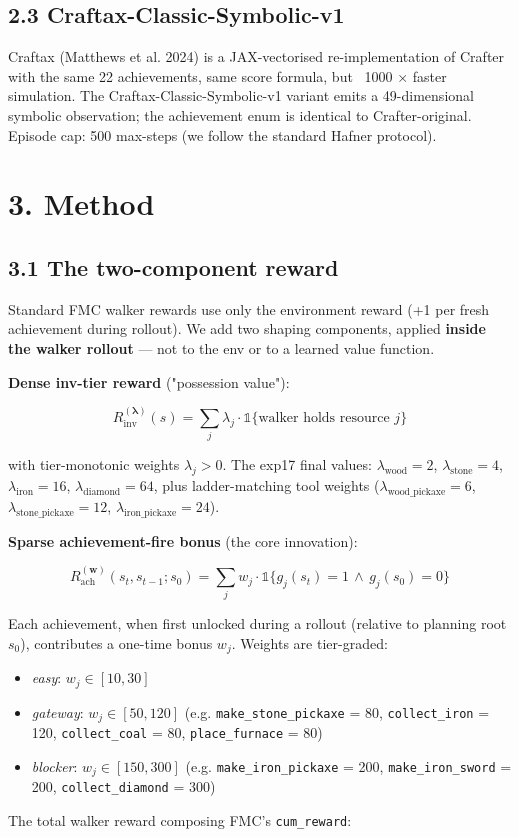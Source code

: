 \subsection{2.3 Craftax-Classic-Symbolic-v1}

Craftax (Matthews et al. 2024) is a JAX-vectorised re-implementation
of Crafter with the same 22 achievements, same score formula, but
~1000 × faster simulation. The Craftax-Classic-Symbolic-v1 variant
emits a 49-dimensional symbolic observation; the achievement enum is
identical to Crafter-original. Episode cap: 500 max-steps (we follow
the standard Hafner protocol).

\hrulefill

\section{3. Method}

\subsection{3.1 The two-component reward}

Standard FMC walker rewards use only the environment reward (+1 per
fresh achievement during rollout). We add two shaping components,
applied \textbf{inside the walker rollout} — not to the env or to a learned
value function.

\textbf{Dense inv-tier reward} ("possession value"):

\[
R_{\text{inv}}^{(\boldsymbol\lambda)}(s) = \sum_{j} \lambda_j \cdot \mathbb{1}\{\text{walker holds resource } j\}
\]

with tier-monotonic weights $\lambda_j > 0$. The exp17 final values:
$\lambda_{\text{wood}} = 2$, $\lambda_{\text{stone}} = 4$,
$\lambda_{\text{iron}} = 16$, $\lambda_{\text{diamond}} = 64$, plus
ladder-matching tool weights ($\lambda_{\text{wood\_pickaxe}} = 6$,
$\lambda_{\text{stone\_pickaxe}} = 12$,
$\lambda_{\text{iron\_pickaxe}} = 24$).

\textbf{Sparse achievement-fire bonus} (the core innovation):

\[
R_{\text{ach}}^{(\mathbf{w})}(s_t, s_{t-1}; s_0) = \sum_j w_j \cdot \mathbb{1}\{g_j(s_t) = 1 \,\wedge\, g_j(s_0) = 0\}
\]

Each achievement, when first unlocked during a rollout (relative to
planning root $s_0$), contributes a one-time bonus $w_j$. Weights are
tier-graded:

\begin{itemize}
\item \emph{easy}: $w_j \in [10, 30]$
\item \emph{gateway}: $w_j \in [50, 120]$ (e.g. \texttt{make\_stone\_pickaxe} = 80, \texttt{collect\_iron} = 120, \texttt{collect\_coal} = 80, \texttt{place\_furnace} = 80)
\item \emph{blocker}: $w_j \in [150, 300]$ (e.g. \texttt{make\_iron\_pickaxe} = 200, \texttt{make\_iron\_sword} = 200, \texttt{collect\_diamond} = 300)
\end{itemize}
The total walker reward composing FMC's \texttt{cum\_reward}:

